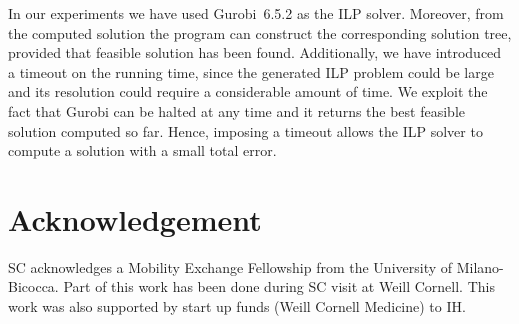 \documentclass[a4paper,USenglish]{article}
\theoremstyle{definition}
\begin{document}
In our experiments we have used Gurobi~6.5.2 as the ILP solver.
Moreover, from the computed solution the program can construct the
corresponding solution tree, provided that feasible solution has been
found.
Additionally, we have introduced a timeout on the running time, since
the generated ILP problem could be large and its resolution could
require a considerable amount of time.
%
We exploit the fact that Gurobi can be halted at any time and it
returns the best feasible solution computed so far.
%
Hence, imposing a timeout allows the ILP solver to compute a solution
with a small total error.

\section*{Acknowledgement}

SC acknowledges a Mobility Exchange Fellowship from the University of
Milano-Bicocca. Part of this work has been done during SC visit at
Weill Cornell.  This work was also supported by start up funds (Weill
Cornell Medicine) to IH.

% 
%
%
%
% 
%


\end{document}
